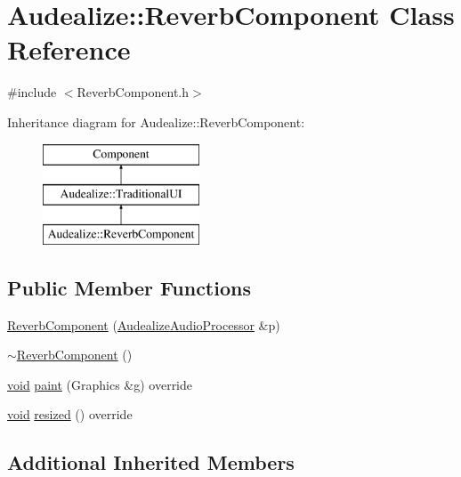 \hypertarget{class_audealize_1_1_reverb_component}{}\section{Audealize\+:\+:Reverb\+Component Class Reference}
\label{class_audealize_1_1_reverb_component}


{\ttfamily \#include $<$Reverb\+Component.\+h$>$}

Inheritance diagram for Audealize\+:\+:Reverb\+Component\+:\begin{figure}[H]
\begin{center}
\leavevmode
\includegraphics[height=3.000000cm]{class_audealize_1_1_reverb_component}
\end{center}
\end{figure}
\subsection*{Public Member Functions}
\begin{DoxyCompactItemize}
\item 
\hyperlink{class_audealize_1_1_reverb_component_ae1177cd6ddb6c6addd9aedf327947c39}{Reverb\+Component} (\hyperlink{class_audealize_1_1_audealize_audio_processor}{Audealize\+Audio\+Processor} \&p)
\item 
\hyperlink{class_audealize_1_1_reverb_component_a31254ec9fcb3f4684183ae68c2ba0b66}{$\sim$\+Reverb\+Component} ()
\item 
\hyperlink{tk_8h_aba408b7cd755a96426e004c015f5de8e}{void} \hyperlink{class_audealize_1_1_reverb_component_a46e9b76ae332f9ae4065e3c4bce91b45}{paint} (Graphics \&g) override
\item 
\hyperlink{tk_8h_aba408b7cd755a96426e004c015f5de8e}{void} \hyperlink{class_audealize_1_1_reverb_component_afd0030d4012d58c8f59ed41edeb04f90}{resized} () override
\end{DoxyCompactItemize}
\subsection*{Additional Inherited Members}


